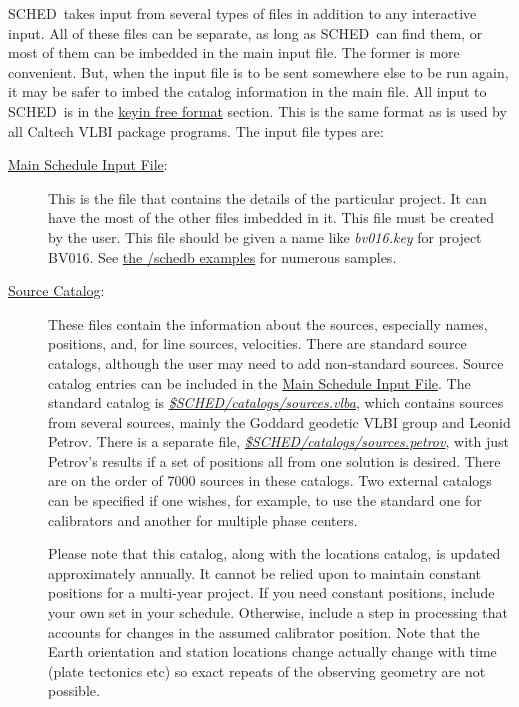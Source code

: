 \documentclass{report}
\newcommand{\schedb}{{\sc SCHED~}}
\begin{document}
\schedb takes input from several types of files in addition to any
interactive input.  All of these files can be separate, as long as
\schedb can find them, or most of them can be imbedded in the main
input file.  The former is more convenient.  But, when the input file
is to be sent somewhere else to be run again, it may be safer to imbed
the catalog information in the main file.  All input to \schedb is in
the
\hyperref[SEC:KEYIN]{keyin free format}
section.
This is the same format as is used by all Caltech VLBI
package programs.  The input file types are:

\begin{description}

\item[
{\hyperref[SEC:SCHPAR]{Main Schedule Input File}}:] This is the
file that contains the details of the particular project.  It can have
the most of the other files imbedded in it.  This file must be created
by the user.  This file should be given a name like {\sl bv016.key}
for project BV016.  See 
{\href{examples}{the /schedb examples}} for numerous samples.



\item[
{\hyperref[SEC:SRCCAT]{Source Catalog}}:] These files contain the
information about the sources, especially names, positions, and, for
line sources, velocities.  There are standard source catalogs,
although the user may need to add non-standard sources.  Source
catalog entries can be included in the 
{\hyperref[SEC:SCHPAR]{Main Schedule Input File}}.
The standard catalog is 
{\href{catalogs/sources.vlba}{{\sl \$SCHED/catalogs/sources.vlba}}},
which contains sources from several sources,
mainly the Goddard geodetic VLBI group
and Leonid Petrov.  There is a separate file, 
{\href{catalogs/sources.petrov}{{\sl \$SCHED/catalogs/sources.petrov}}},
with just Petrov's results if a set of positions all from one solution is
desired.  There are on the order of 7000 sources in these catalogs.
Two external catalogs can be specified if one wishes, for example, to
use the standard one for calibrators and another for multiple phase
centers.  

Please note that this catalog, along with the locations catalog, is
updated approximately annually.  It cannot be relied upon to maintain
constant positions for a multi-year project.  If you need constant
positions, include your own set in your schedule.  Otherwise, include
a step in processing that accounts for changes in the assumed
calibrator position.  Note that the Earth orientation and station
locations change actually change with time (plate tectonics etc) so
exact repeats of the observing geometry are not possible.


\end{description}
\end{document}
